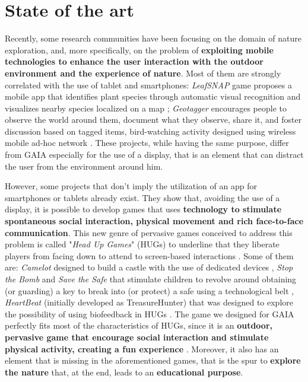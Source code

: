 \documentclass[a4paper,11pt]{report}
\begin{document}
\chapter{State of the art}
Recently, some research communities have been focusing on the domain of nature exploration, and, more specifically, on the problem of \textbf{exploiting mobile technologies to enhance the user interaction with the outdoor environment and the experience of nature}. Most of them are strongly correlated with the use of tablet and smartphones: \emph{LeafSNAP} game proposes a mobile app that identifies plant species through automatic visual recognition and visualizes nearby species localized on a map \cite{leafsnap}; \emph{Geotagger} encourages people to observe the world around them, document what they observe, share it, and foster discussion based on tagged items, bird-watching activity designed using wireless mobile ad-hoc network \cite{geotagger}. These projects, while having the same purpose, differ from GAIA especially for the use of a display, that is an element that can distract the user from the environment around him.\par
However, some projects that don't imply the utilization of an app for smartphones or tablets already exist. They show that, avoiding the use of a display, it is possible to develop games that uses \textbf{technology to stimulate spontaneous social interaction, physical movement and rich face-to-face communication}. This new genre of pervasive games conceived to address this problem is called "\emph{Head Up Games}" (HUGs) to underline that they liberate players from facing down to attend to screen-based interactions \cite{hug}. Some of them are: \emph{Camelot} designed to build a castle with the use of dedicated devices \cite{camelot}, \emph{Stop the Bomb} and \emph{Save the Safe} that stimulate children to revolve around obtaining (or guarding) a key to break into (or protect) a safe using a technological belt \cite{savethesafe}, \emph{HeartBeat} (initially developed as TreasureHunter) that was designed to explore the possibility of using biofeedback in HUGs \cite{heartbeat}. The game we designed for GAIA perfectly fits most of the characteristics of HUGs, since it is an \textbf{outdoor, pervasive game that encourage social interaction and stimulate physical activity, creating a fun experience} \cite{hug}. Moreover, it also has an element that is missing in the aforementioned games, that is the spur to \textbf{explore the nature} that, at the end, leads to an \textbf{educational purpose}. \par
\end{document}
